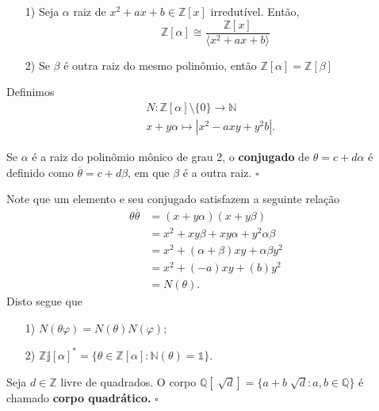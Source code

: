 \documentclass[AlgebraII/algebraII_notes.tex]{subfiles}
\begin{document}
\begin{example}[Exercícios]
	\begin{itemize}
		\item[1)] Seja \(\alpha \) raiz de \(x^{2} + ax + b\in \mathbb{Z}[x]\) irredutível. Então,
		      \[
			      \mathbb{Z}[\alpha ] \cong{\frac{\mathbb{Z}[x]}{\langle x^{2} + ax + b \rangle}}
		      \]
		\item[2)] Se \(\beta \) é outra raiz do mesmo polinômio, então \(\mathbb{Z}[\alpha ] = \mathbb{Z}[\beta ]\)
	\end{itemize}
\end{example}
Definimos
\begin{align*}
	 & N:\mathbb{Z}[\alpha ]\setminus{\{0\}}\rightarrow \mathbb{N} \\
	 & x+y\alpha \mapsto |x^{2} - axy + y^{2}b|.
\end{align*}
\begin{def*}
	Se \(\alpha \) é a raiz do polinômio mônico de grau 2, o \textbf{conjugado} de \(\theta = c+d\alpha \) é definido como \(\overline{\theta } = c + d\beta \), em que \(\beta \) é a outra raiz. \(\square\)
\end{def*}
Note que um elemento e seu conjugado satisfazem a seguinte relação
\begin{align*}
	\theta \overline{\theta } & = (x+y\alpha )(x+y\beta)                           \\
	                          & = x^{2} + xy\beta  + xy\alpha  + y^{2}\alpha \beta \\
	                          & = x^{2} + (\alpha +\beta )xy + \alpha \beta y^{2}  \\
	                          & = x^{2} + (-a)xy + (b)y^{2}                        \\
	                          & = N(\theta).
\end{align*}
Disto segue que
\begin{itemize}
	\item[1)] \(N(\theta \varphi )=N(\theta )N(\varphi )\);
	\item[2)] \(\mathbb{Zj[\alpha ]^{*} = \{\theta \in \mathbb{Z}[\alpha ]: N(\theta ) = 1\}}\).
\end{itemize}
\begin{def*}
	Seja \(d\in \mathbb{Z}\) livre de quadrados. O corpo \(\mathbb{Q}[\sqrt[]{d}] = \{a + b\sqrt[]{d}: a, b\in \mathbb{Q}\}\) é
	chamado \textbf{corpo quadrático.} \(\square\)
\end{def*}
\end{document}
